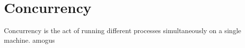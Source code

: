 \documentclass[12pt,a4paper,teal]{bbe}
\begin{document}
	\chapter{Concurrency}
	Concurrency is the act of running different 
	processes simultaneously on a single machine. 
	amogus
\end{document}

